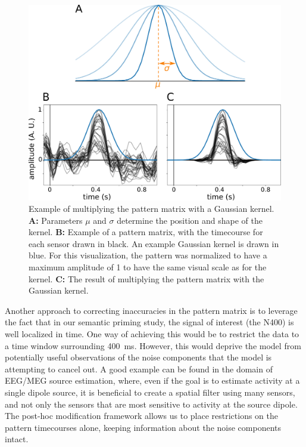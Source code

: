\documentclass[a4paper]{vanvliet_paper}
\begin{document}
\begin{figure}
    \includegraphics[width=\textwidth]{figures/kernel.pdf}
    \caption{Example of multiplying the pattern matrix with a Gaussian kernel. \textbf{A:} Parameters $\mu$ and $\sigma$ determine the position and shape of the kernel. \textbf{B:} Example of a pattern matrix, with the timecourse for each sensor drawn in black. An example Gaussian kernel is drawn in blue. For this visualization, the pattern was normalized to have a maximum amplitude of 1 to have the same visual scale as for the kernel. \textbf{C:} The result of multiplying the pattern matrix with the Gaussian kernel.}\label{fig:kernel}
\end{figure}

Another approach to correcting inaccuracies in the pattern matrix is to leverage the fact that in our semantic priming study, the signal of interest (the N400) is well localized in time.
One way of achieving this would be to restrict the data  to a time window surrounding \SI{400}{\milli\second}.
However, this would deprive the model from potentially useful observations of the noise components that the model is attempting to cancel out.
A good example can be found in the domain of \gls{EEG}/\gls{MEG} source estimation, where, even if the goal is to estimate activity at a single dipole source, it is beneficial to create a spatial filter using many sensors, and not only the sensors that are most sensitive to activity at the source dipole\cite{DeCheveigne2008}.
The post-hoc modification framework allows us to place restrictions on the pattern timecourses alone, keeping information about the noise components intact.
\end{document}
